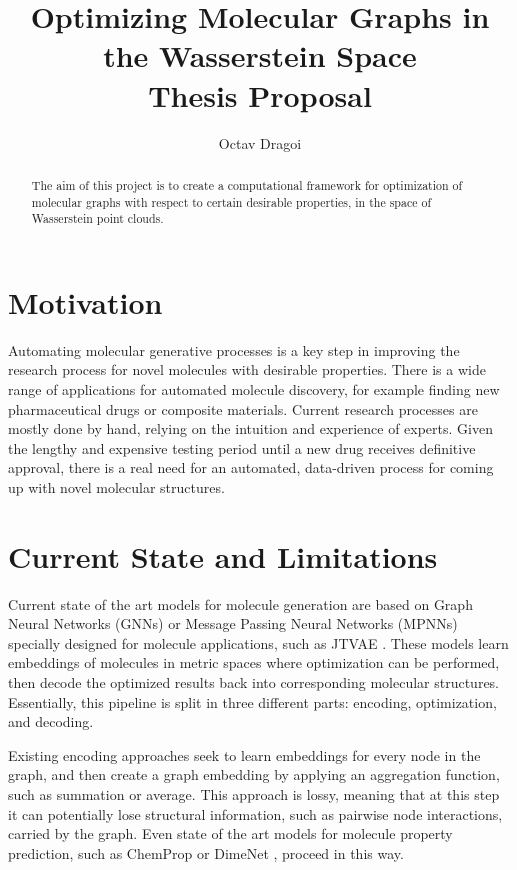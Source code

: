 \documentclass[11pt]{article}
\begin{document}
\title{Optimizing Molecular Graphs in the Wasserstein Space \\
    \large Thesis Proposal}
\author{Octav Dragoi}

\maketitle


\begin{abstract}
    The aim of this project is to create a computational framework for optimization of molecular graphs with respect to certain desirable properties, in the space of Wasserstein point clouds.
\end{abstract}

\section{Motivation}
Automating molecular generative processes is a key step in improving the research process for novel molecules with desirable properties. There is a wide range of applications for automated molecule discovery, for example finding new pharmaceutical drugs or composite materials. Current research processes are mostly done by hand, relying on the intuition and experience of experts. Given the lengthy and expensive testing period until a new drug receives definitive approval, there is a real need for an automated, data-driven process for coming up with novel molecular structures.

\section{Current State and Limitations}
Current state of the art models for molecule generation are based on Graph Neural Networks (GNNs) or Message Passing Neural Networks (MPNNs) specially designed for molecule applications, such as JTVAE \cite{DBLP:journals/corr/abs-1802-04364}. These models learn embeddings of molecules in metric spaces where optimization can be performed, then decode the optimized results back into corresponding molecular structures. Essentially, this pipeline is split in three different parts: encoding, optimization, and decoding.

Existing encoding approaches seek to learn embeddings for every node in the graph, and then create a graph embedding by applying an aggregation function, such as summation or average. This approach is lossy, meaning that at this step it can potentially lose structural information, such as pairwise node interactions, carried by the graph. Even state of the art models for molecule property prediction, such as ChemProp \cite{yang2019analyzing} or DimeNet \cite{Klicpera2020Directional}, proceed in this way.
\end{document}
